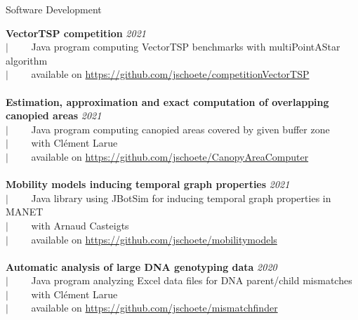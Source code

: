 \documentclass[french]{resume} %
\begin{document}
\begin{rSection}{Software Development}
	
	
	{\bf VectorTSP competition} \hfill {\em 2021}\\
	$| \qquad$ Java program computing VectorTSP benchmarks with multiPointAStar algorithm\\
	$| \qquad$ available on \url{https://github.com/jschoete/competitionVectorTSP}\\
	\\	
	{\bf Estimation, approximation and exact computation of overlapping canopied areas} \hfill {\em 2021}\\
	$| \qquad$ Java program computing canopied areas covered by given buffer zone\\
	$| \qquad$ with Clément Larue\\
	$| \qquad$ available on \url{https://github.com/jschoete/CanopyAreaComputer}\\
	\\	
	{\bf Mobility models inducing temporal graph properties} \hfill {\em 2021}\\
	$| \qquad$ Java library using JBotSim for inducing temporal graph properties in MANET\\
	$| \qquad$ with Arnaud Casteigts\\
	$| \qquad$ available on \url{https://github.com/jschoete/mobilitymodels}\\
	\\
	{\bf Automatic analysis of large DNA genotyping data} \hfill {\em 2020}\\
	$| \qquad$ Java program analyzing Excel data files for DNA parent/child mismatches\\
	$| \qquad$ with Clément Larue\\
	$| \qquad$ available on \url{https://github.com/jschoete/mismatchfinder}
\end{rSection}
\end{document}
